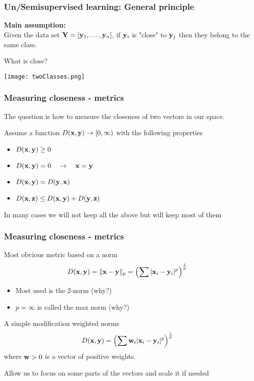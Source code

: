 \documentclass[12pt,fleqn]{beamer}
\begin{document}
\begin{frame}
\frametitle{Un/Semisupervised learning: General principle}

{\bf Main assumption:}\\
Given the data set ${\bf Y} = [{\bf y}_1, \ldots, {\bf y}_n]$, if ${\bf y}_i$ is "close" to
${\bf y}_j$ then they belong to the same class.

\bigskip

What is close?

\centering
\texttt{[image: twoClasses.png]}


\end{frame}


\begin{frame}
\frametitle{Measuring closeness - metrics }

The question is how to measure the closeness of two vectors in our space.

Assume a function $D({\bf x},{\bf y}) \rightarrow [0,\infty)$ with the following properties
\begin{itemize}
\item  $D({\bf x},{\bf y}) \ge 0$
\item $D({\bf x},{\bf y}) = 0 \quad \rightarrow \quad {\bf x} = {\bf y}$
\item $D({\bf x},{\bf y}) = D({\bf y},{\bf x})$
\item $D({\bf x},{\bf z}) \le D({\bf x},{\bf y}) + D({\bf y},{\bf z})$
\end{itemize}	

In many cases we will not keep all the above but will keep most of them

\end{frame}

\begin{frame}
\frametitle{Measuring closeness - metrics }

Most obvious metric based on a norm
$$ D({\bf x},{\bf y}) = \|{\bf x} - {\bf y}\|_p = \left( \sum |{\bf x}_i-{\bf y}_i|^p \right)^{\frac 1p} $$

\begin{itemize}
\item Most used is the $2$-norm (why?)
\item $p=\infty$ is called the max norm (why?)
\end{itemize}

\bigskip

A simple modification weighted norms
$$ D({\bf x},{\bf y}) = \left( \sum {\bf w}_i |{\bf x}_i-{\bf y}_i|^p \right)^{\frac 1p} $$
where ${\bf w} >0$ is a vector of positive weights.

Allow us to focus on some parts of the vectors and scale it if needed

\end{frame}
\end{document}
